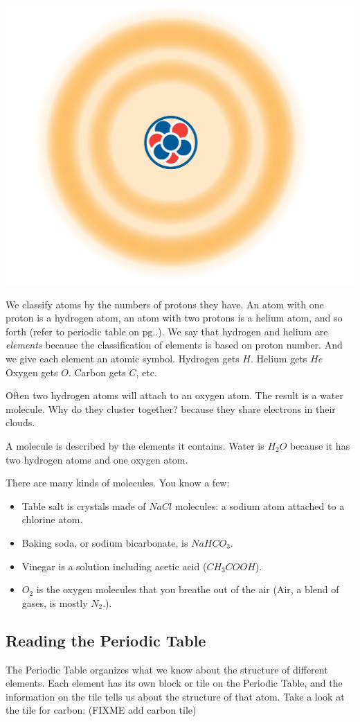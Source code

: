\includegraphics[width=.5\textwidth]{atomCloud.png}


We classify atoms by the numbers of protons they have. An atom with one proton is a
hydrogen atom, an atom with two protons is a helium atom, and so forth (refer to periodic table on pg..). We say that hydrogen and helium are \textit{elements} because the classification of elements is based on proton number. And we give
each element an atomic symbol. Hydrogen gets $H$. Helium gets $He$ Oxygen gets
$O$. Carbon gets $C$, etc.

Often two hydrogen atoms will attach to an oxygen atom. The result is
a water molecule. Why do they cluster together? because they share 
electrons in their clouds.

A molecule is described by the elements it contains. Water is $H_2O$
because it has two hydrogen atoms and one oxygen atom.

There are many kinds of molecules. You know a few:
\begin{itemize}
\item Table salt is crystals made of $NaCl$ molecules: a sodium atom attached to a chlorine atom.
\item Baking soda, or sodium bicarbonate, is $NaHCO_3$.
\item Vinegar is a solution including acetic acid ($CH_3COOH$).
\item $O_2$ is the oxygen molecules that you breathe out of the air (Air, a blend of gases, is mostly $N_2$.).
\end{itemize}

\subsection{Reading the Periodic Table}
The Periodic Table organizes what we know about the structure of different 
elements. Each element has its own block or tile on the Periodic Table, and the 
information on the tile tells us about the structure of that atom. Take a look at 
the tile for carbon: (FIXME add carbon tile)

